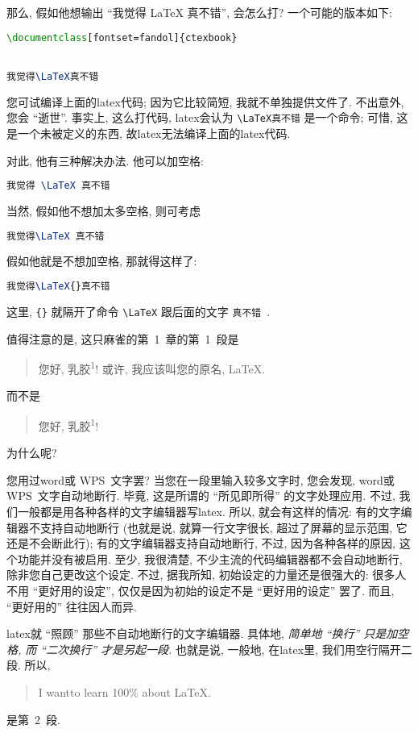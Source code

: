 那么, 假如他想输出 ``我觉得 \LaTeX{} 真不错'', 会怎么打?
一个可能的版本如下:
\begin{lstlisting}[language=TeX]
\documentclass[fontset=fandol]{ctexbook}


我觉得\LaTeX真不错

\end{lstlisting}
您可试编译上面的\gls{latex}代码;
因为它比较简短, 我就不单独提供文件了.
不出意外, 您会 ``逝世''.
事实上, 这么打代码, \gls{latex}会认为
\verb`\LaTeX真不错`
是一个命令;
可惜, 这是一个未被定义的东西,
故\gls{latex}无法编译上面的\gls{latex}代码.

对此, 他有三种解决办法. 他可以加空格:
\begin{lstlisting}[language=TeX]
我觉得 \LaTeX 真不错
\end{lstlisting}
当然, 假如他不想加太多空格, 则可考虑
\begin{lstlisting}[language=TeX]
我觉得\LaTeX 真不错
\end{lstlisting}
假如他就是不想加空格, 那就得这样了:
\begin{lstlisting}[language=TeX]
我觉得\LaTeX{}真不错
\end{lstlisting}
这里, \verb`{}` 就隔开了命令 \verb`\LaTeX`
跟后面的文字 \verb`真不错`~.

值得注意的是, 这只麻雀的第~1~章的第~1~段是
\begin{quotation}
    您好, 乳胶\textsuperscript{1}!
    或许, 我应该叫您的原名, \LaTeX{}.
\end{quotation}
而不是
\begin{quotation}
    您好, 乳胶\textsuperscript{1}!
\end{quotation}
为什么呢?

您用过\gls{word}或 WPS~文字罢?
当您在一段里输入较多文字时,
您会发现, \gls{word}或 WPS~文字自动地断行.
毕竟, 这是所谓的 ``所见即所得'' 的文字处理应用.
不过, 我们一般都是用各种各样的文字编辑器写\gls{latex}.
所以, 就会有这样的情况:
有的文字编辑器不支持自动地断行
(也就是说, 就算一行文字很长,
超过了屏幕的显示范围, 它还是不会断此行);
有的文字编辑器支持自动地断行,
不过, 因为各种各样的原因, 这个功能并没有被启用.
至少, 我很清楚,
不少主流的代码编辑器都不会自动地断行,
除非您自己更改这个设定.
不过, 据我所知, 初始设定的力量还是很强大的:
很多人不用 ``更好用的设定'',
仅仅是因为初始的设定不是 ``更好用的设定'' 罢了.
而且, ``更好用的'' 往往因人而异.

\gls{latex}就 ``照顾'' 那些不自动地断行的文字编辑器.
具体地, \emph{简单地 ``换行'' 只是加空格,
    而 ``二次换行'' 才是另起一段.}
也就是说, 一般地, 在\gls{latex}里, 我们用空行隔开二段.
所以,
\begin{quotation}
    I wantto learn 100\% about \LaTeX{}.
\end{quotation}
是第~2~段.

